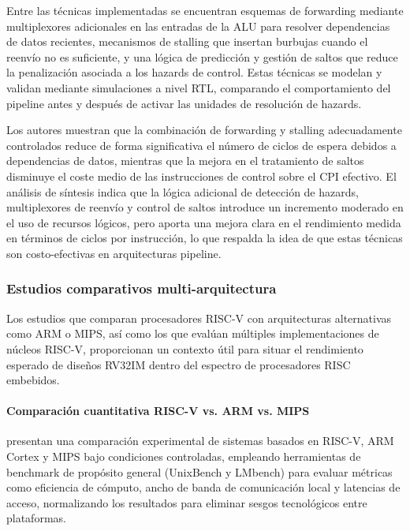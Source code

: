 Entre las técnicas implementadas se encuentran esquemas de forwarding mediante
multiplexores adicionales en las entradas de la ALU para resolver dependencias
de datos recientes, mecanismos de stalling que insertan burbujas cuando el
reenvío no es suficiente, y una lógica de predicción y gestión de saltos que
reduce la penalización asociada a los hazards de control. Estas técnicas se
modelan y validan mediante simulaciones a nivel RTL, comparando el
comportamiento del pipeline antes y después de activar las unidades de
resolución de hazards.

Los autores muestran que la combinación de forwarding y stalling adecuadamente
controlados reduce de forma significativa el número de ciclos de espera debidos
a dependencias de datos, mientras que la mejora en el tratamiento de saltos
disminuye el coste medio de las instrucciones de control sobre el CPI efectivo.
El análisis de síntesis indica que la lógica adicional de detección de hazards,
multiplexores de reenvío y control de saltos introduce un incremento moderado en
el uso de recursos lógicos, pero aporta una mejora clara en el rendimiento
medida en términos de ciclos por instrucción, lo que respalda la idea de que
estas técnicas son costo-efectivas en arquitecturas
pipeline.


\subsubsection{Estudios comparativos multi-arquitectura}

Los estudios que comparan procesadores RISC-V con arquitecturas alternativas
como ARM o MIPS, así como los que evalúan múltiples implementaciones de núcleos
RISC-V, proporcionan un contexto útil para situar el rendimiento esperado de
diseños RV32IM dentro del espectro de procesadores RISC
embebidos.\parencite{Liu2021Performance,Heinz2019Catalog}


\paragraph{Comparación cuantitativa RISC-V vs. ARM vs. MIPS}

\textcite{Liu2021Performance} presentan una comparación experimental de
sistemas basados en RISC-V, ARM Cortex y MIPS bajo condiciones controladas,
empleando herramientas de benchmark de propósito general (UnixBench y LMbench)
para evaluar métricas como eficiencia de cómputo, ancho de banda de
comunicación local y latencias de acceso, normalizando los resultados para
eliminar sesgos tecnológicos entre plataformas.

